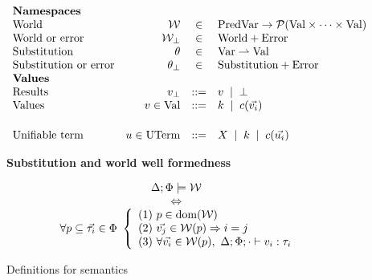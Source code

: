 \documentclass[acmsmall,screen,nonacm]{acmart}
\newcommand{\BNFALT}{\;\;|\;\;}
\newcommand{\hdr}[2]{%
\flushleft
\textbf{#1} \hfill {#2} \\
\centering
}
\theoremstyle{definition}
\begin{document}
\begin{figure}[t]

  \[\begin{array}{lrcl}
    \multicolumn{4}{l}{\textbf{Namespaces}} \\
    \text{World} & \world &\in& \mathrm{PredVar} \rightarrow \mathcal{P}
                                (\mathrm{Val} \times \cdots \times \mathrm{Val}) \\
    \text{World or error} & \world_\bot &\in& \mathrm{World} + \mathrm{Error} \\
    \text{Substitution} & \theta     &\in& \mathrm{Var} \rightharpoonup \mathrm{Val} \\
    \text{Substitution or error} & \theta_\bot &\in& \mathrm{Substitution} + \mathrm{Error} \\
    \multicolumn{4}{l}{\textbf{Values}} \\
    \text{Results} & v_\bot &::=& v \BNFALT \bot \\
    \text{Values} & v \in \mathrm{Val} &::=& k \BNFALT c(\vec{v_i}) \\

  ~ \\[0.25em]

    \text{Unifiable term} & u \in \mathrm{UTerm} &::=& X \BNFALT k \BNFALT c(\vec{u_i}) \\
  \end{array} \]

  \hdr{Substitution and world well formedness}{
    \quad \fbox{$\implicit{\Delta; \Phi; {}} \Gamma \models \theta$}
    \quad \fbox{$\Delta; \Phi \models \world$}
  }

  {\[ 
  \begin{array}{c}
    \Delta; \Phi \models \world \\
    \Leftrightarrow \\ 
    \forall p \subseteq \vec{\tau_i} \in \Phi ~ \left\{
      \begin{array}{l@{}}
          \text{(1) } p \in \dom(\world) \\
          \text{(2) } \vec{v_j} \in \world(p) \Rightarrow i = j \\
          \text{(3) } \forall \vec{v_i} \in \world(p), ~ \Delta; \Phi; \cdot \vdash v_i : \tau_i \\
      \end{array} 
      \right.
  \end{array}
  \]}

  \caption{Definitions for semantics}
  \label{fig:opsem-defs}
\end{figure}
\end{document}
